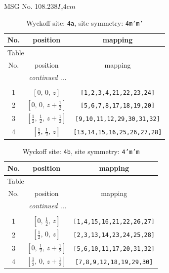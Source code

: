 \documentclass[fleqn,8pt]{jsarticle}
\begin{document}
\setcounter{MaxMatrixCols}{32}

\renewcommand{\tablename}{Table~}
\renewcommand{\figurename}{Figure~}
\begin{center}
\LARGE
MSG No. 108.238\quad$I_{c}4cm$
\end{center}
\renewcommand{\arraystretch}{1.2}
\begin{longtable}{ccc}
\caption{Wyckoff site: {\tt 4a}, site symmetry: {\tt 4m'm'}}
 \\
 \hline \hline
No. & position & mapping \\ \hline \endfirsthead

\multicolumn{2}{l}{\tablename\ \thetable{}} \\
 \hline \hline
No. & position & mapping \\ \hline \endhead

 \hline \hline
\multicolumn{2}{r}{\footnotesize\it continued ...} \\ \endfoot

 \hline \hline
\multicolumn{2}{r}{} \\ \endlastfoot

1 & $\left[ 0,\, 0,\, z \right]$ & {\tt [1,2,3,4,21,22,23,24]} \\ \hline
2 & $\left[ 0,\, 0,\, z + \frac{1}{2} \right]$ & {\tt [5,6,7,8,17,18,19,20]} \\ \hline
3 & $\left[ \frac{1}{2},\, \frac{1}{2},\, z + \frac{1}{2} \right]$ & {\tt [9,10,11,12,29,30,31,32]} \\ \hline
4 & $\left[ \frac{1}{2},\, \frac{1}{2},\, z \right]$ & {\tt [13,14,15,16,25,26,27,28]} \\
\end{longtable}
\renewcommand{\arraystretch}{1.2}
\begin{longtable}{ccc}
\caption{Wyckoff site: {\tt 4b}, site symmetry: {\tt 4'm'm}}
 \\
 \hline \hline
No. & position & mapping \\ \hline \endfirsthead

\multicolumn{2}{l}{\tablename\ \thetable{}} \\
 \hline \hline
No. & position & mapping \\ \hline \endhead

 \hline \hline
\multicolumn{2}{r}{\footnotesize\it continued ...} \\ \endfoot

 \hline \hline
\multicolumn{2}{r}{} \\ \endlastfoot

1 & $\left[ 0,\, \frac{1}{2},\, z \right]$ & {\tt [1,4,15,16,21,22,26,27]} \\ \hline
2 & $\left[ \frac{1}{2},\, 0,\, z \right]$ & {\tt [2,3,13,14,23,24,25,28]} \\ \hline
3 & $\left[ 0,\, \frac{1}{2},\, z + \frac{1}{2} \right]$ & {\tt [5,6,10,11,17,20,31,32]} \\ \hline
4 & $\left[ \frac{1}{2},\, 0,\, z + \frac{1}{2} \right]$ & {\tt [7,8,9,12,18,19,29,30]} \\
\end{longtable}
\end{document}
